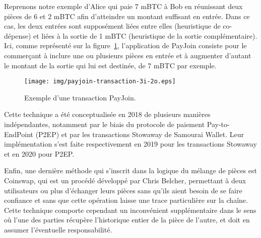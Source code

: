 Reprenons notre exemple d'Alice qui paie 7 mBTC à Bob en réunissant deux pièces de 6 et 2 mBTC afin d'atteindre un montant suffisant en entrée. Dans ce cas, les deux entrées sont supposément liées entre elles (heuristique de co-dépense) et liées à la sortie de 1 mBTC (heuristique de la sortie complémentaire). Ici, comme représenté sur la figure~\ref{fig:payjoin-transaction}, l'application de PayJoin consiste pour le commerçant à inclure une ou plusieurs pièces en entrée et à augmenter d'autant le montant de la sortie qui lui est destinée, de 7 mBTC par exemple.

\begin{figure}[ht]
  \centering
  \texttt{[image: img/payjoin-transaction-3i-2o.eps]}
  \caption{Exemple d'une transaction PayJoin.}
  \label{fig:payjoin-transaction}
\end{figure}

Cette technique a été conceptualisée en 2018 de plusieurs manières indépendantes, notamment par le biais du protocole de paiement Pay-to-EndPoint (P2EP) et par les transactions Stowaway de Samourai Wallet. Leur implémentation s'est faite respectivement en 2019 pour les transactions Stowaway et en 2020 pour P2EP.

Enfin, une dernière méthode qui s'inscrit dans la logique du mélange de pièces est Coinswap, qui est un procédé développé par Chris Belcher, permettant à deux utilisateurs ou plus d'échanger leurs pièces sans qu'ils aient besoin de se faire confiance et sans que cette opération laisse une trace particulière sur la chaîne. Cette technique comporte cependant un inconvénient supplémentaire dans le sens où l'une des parties récupère l'historique entier de la pièce de l'autre, et doit en assumer l'éventuelle responsabilité.

